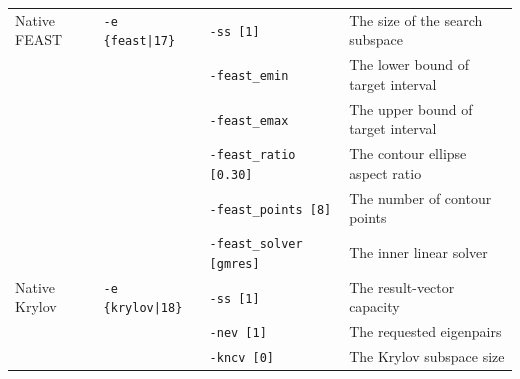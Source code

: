 \documentclass[a4paper]{article}
\begin{document}
\begin{minipage}[t]{\textwidth}
\begin{center}
\begin{tabular}{l|lll}
 Native FEAST                      & \verb=-e {feast|17}=    &
 \verb=-ss [1]= & The size of the search subspace \\
                                   &                         &
 \verb=-feast_emin= & The lower bound of target interval \\
                                   &                         &
 \verb=-feast_emax= & The upper bound of target interval \\
                                   &                         &
 \verb=-feast_ratio [0.30]= & The contour ellipse aspect ratio \\
                                   &                         &
 \verb=-feast_points [8]= & The number of contour points \\
                                   &                         &
 \verb=-feast_solver [gmres]= & The inner linear solver \\
 Native Krylov                      & \verb=-e {krylov|18}= &
 \verb=-ss [1]= & The result-vector capacity \\
                                    &                        &
 \verb=-nev [1]= & The requested eigenpairs \\
                                    &                        &
 \verb=-kncv [0]= & The Krylov subspace size \\
\hline         
\end{tabular}
\end{center}
\end{minipage}
\\ \\
\end{document}
